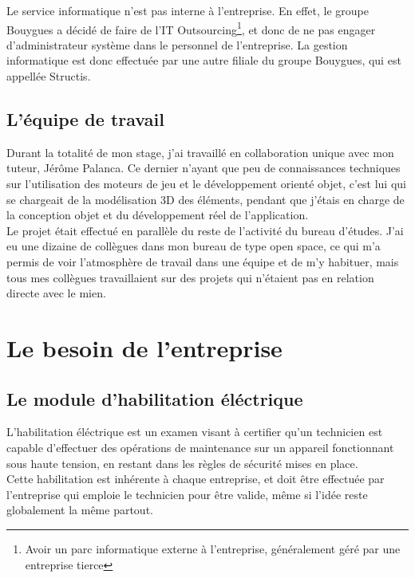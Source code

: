 \documentclass[a4paper]{article}
\begin{document}
    \vfill
    Le service informatique n'est pas interne à l'entreprise. En effet, le groupe Bouygues a décidé de faire de l'IT Outsourcing\footnote{Avoir un parc informatique externe à l'entreprise, généralement géré par une entreprise tierce}, et donc de ne pas engager d'administrateur système dans le personnel de l'entreprise. La gestion informatique est donc effectuée par une autre filiale du groupe Bouygues, qui est appellée Structis. \\
    \vfill  

    \newpage

    \subsection{L'équipe de travail}

    Durant la totalité de mon stage, j'ai travaillé en collaboration unique avec mon tuteur, Jérôme Palanca. Ce dernier n'ayant que peu de connaissances techniques sur l'utilisation des moteurs de jeu et le développement orienté objet, c'est lui qui se chargeait de la modélisation 3D des éléments, pendant que j'étais en charge de la conception objet et du développement réel de l'application. \\
    
    Le projet était effectué en parallèle du reste de l'activité du bureau d'études. J'ai eu une dizaine de collègues dans mon bureau de type open space, ce qui m'a permis de voir l'atmosphère de travail dans une équipe et de m'y habituer, mais tous mes collègues travaillaient sur des projets qui n'étaient pas en relation directe avec le mien. \\
    
    \section{Le besoin de l'entreprise}
    \subsection{Le module d'habilitation éléctrique}

        L'habilitation éléctrique est un examen visant à certifier qu'un technicien est capable d'effectuer des opérations de maintenance sur un appareil fonctionnant sous haute tension, en restant dans les règles de sécurité mises en place. \\

        Cette habilitation est inhérente à chaque entreprise, et doit être effectuée par l'entreprise qui emploie le technicien pour être valide, même si l'idée reste globalement la même partout. \\
\end{document}
